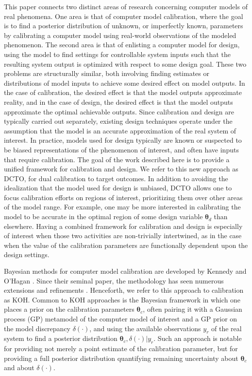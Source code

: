 \documentclass[10pt]{asme2ej}
\begin{document}
%
This paper connects two distinct areas of research concerning computer models of real phenomena.
%
One area is that of computer model calibration, where the goal is to find a posterior distribution of unknown, or imperfectly known, parameters by calibrating a computer model using real-world observations of the modeled phenomenon.
%
The second area is that of enlisting a computer model for design, using the model to find settings for controllable system inputs such that the resulting system output is optimized with respect to some design goal.
%
These two problems are structurally similar, both involving finding estimates or distributions of model inputs to achieve some desired effect on model outputs.
%
In the case of calibration, the desired effect is that the model outputs approximate reality, and in the case of design, the desired effect is that the model outputs approximate the optimal achievable outputs.
%
Since calibration and design are typically carried out separately, existing design techniques operate under the assumption that the model is an accurate approximation of the real system of interest.
%
In practice, models used for design typically are known or suspected to be biased representations of the phenomenon of interest, and often have inputs that require calibration.
%
The goal of the work described here is to provide a unified framework for calibration and design.
%
We refer to this new approach as DCTO, for dual calibration to target outcomes.
%
In addition to avoiding the idealization that the model used for design is unbiased, DCTO allows one to focus calibration efforts on regions of interest, prioritizing them over other areas of the model range.
%
For example, one may be more interested in calibrating the model to be accurate in the optimal region of some design variable $\boldsymbol \theta_d$ than elsewhere.
%
Having a combined framework for calibration and design is especially of interest when those two activities are non-trivially intertwined, as in the case when the value of the calibration parameters are functionally dependent upon the design settings.
%

%
Bayesian methods for computer model calibration are developed by Kennedy and O'Hagan \cite{Kennedy2001}.
%
Since their seminal paper, the methodology has seen numerous extensions and refinements \cite{Higdon2004,Williams2006,Bayarri2007a,Bayarri2007b,Paulo2012,Brynjarsdottir2014}.
%
Henceforth, we refer to this approach to calibration as KOH.
%
Common to KOH approaches is the Bayesian framework in which one places a prior on the calibration parameters $\boldsymbol \theta_c$, often pairing it with a Gaussian process (GP) metamodel of the computer model of interest and a GP prior on the model discrepancy $\delta(\cdot)$, and using the available observations $y_r$ of the real system to find a posterior distribution $\boldsymbol\theta_c,\delta(\cdot)|y_r$.
%
Such an approach is notable for providing not merely a point estimate of the calibration parameter, but for providing a full posterior distribution quantifying remaining uncertainty about $\boldsymbol\theta_c$ and about $\delta(\cdot)$.
%
\end{document}

